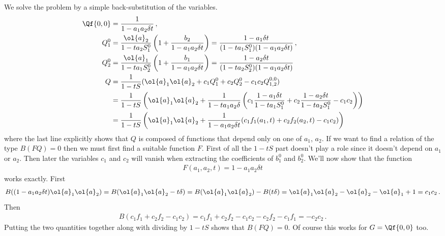 We solve the problem by a simple back-substitution of the variables.
\begin{align}
\Qf{0,0} & = \frac{1}{1-a_1a_2\delta t}\,,\\
Q_1^0 & = \frac{\ol{a}_2}{1-t a_2 S_1^0}\left(1+\frac{b_2}{1-a_1a_2 \delta t}\right) = \frac{1 -  a_1 \delta t}{(1-t a_1S_1^0)(1-a_1a_2\delta t)}\,,\\
Q_2^0 & = \frac{\ol{a}_1}{1-t a_1 S_2^0}\left(1+\frac{b_1}{1-a_1a_2 \delta t}\right) = \frac{1 -  a_2 \delta t}{(1-t a_2S_2^0)(1-a_1a_2\delta t)}\\
Q &= \frac{1}{1-tS}(\ol{a}_1\ol{a}_2 + c_1 Q_1^0 + c_2 Q_2^0 - c_1 c_2 Q_{1,2}^{0,0})\\
&=\frac{1}{1-tS}\left (\ol{a}_1\ol{a}_2 + \frac{1}{1-ta_1a_2 \delta}\left(c_1 \frac{1 -  a_1 \delta t}{1-t a_1S_1^0} + c_2 \frac{1 -  a_2 \delta t}{1-t a_2S_1^0} - c_1 c_2 \right) \right)\\
&= \frac{1}{1-tS}\left(\ol{a}_1\ol{a}_2 + \frac{1}{1-a_1a_2\delta t}(c_1 f_1(a_1,t) + c_2 f_2(a_2,t)-c_1c_2)\right)
\end{align}
where the last line explicitly shows that $Q$ is composed of functions that depend only on one of $a_1$, $a_2$. If we want to find a relation of the type $B(FQ) = 0$ then we must first find a suitable function $F$. First of all the $1-tS$ part doesn't play a role since it doesn't depend on $a_1$ or $a_2$. Then later the variables $c_1$ and $c_2$ will vanish when extracting the coefficients of $b_1^0$ and $b_2^0$. We'll now show that the function
\begin{align}
	F(a_1,a_2,t) = 1 - a_1 a_2 \delta t
\end{align}
works exactly. First
\begin{align}
B((1 - a_1 a_2 \delta t)\ol{a}_1\ol{a}_2) = B(\ol{a}_1\ol{a}_2 - t \delta) = B(\ol{a}_1\ol{a}_2) - B(t \delta) = \ol{a}_1\ol{a}_2- \ol{a}_2-\ol{a}_1 + 1 = c_1 c_2\,.
\end{align}
Then
\begin{align}
	B(c_1 f_1+ c_2 f_2-c_1c_2) = c_1 f_1 + c_2 f_2 -c_1c_2 - c_2 f_2 - c_1 f_1 = -c_2 c_2\,.
\end{align}
Putting the two quantities together along with dividing by $1-tS$ shows that $B(FQ) = 0$. Of course this works for $G = \Qf{0,0}$ too.

